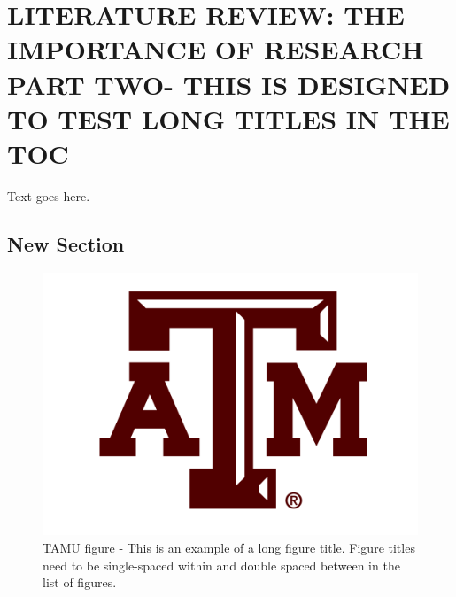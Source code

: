 %
%
%


\chapter{\uppercase {Literature Review: The Importance of Research Part Two- This is designed to test long titles in the TOC}}

Text goes here.

\section{New Section}
\begin{figure}[H]
\centering
\includegraphics[scale=.50]{Figures/TAM-Logo.png}
\caption{TAMU figure - This is an example of a long figure title.  Figure titles need to be single-spaced within and double spaced between in the list of figures.}
\label{fig:landscapepenguins}
\end{figure}

